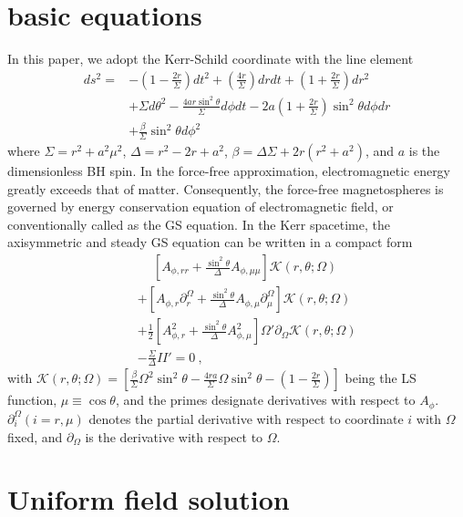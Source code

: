 \documentclass[aps,prd,reprint,nofootinbib, superscriptaddress]{revtex4-1}
\def\nn{\nonumber}
\def\ct{\cos\theta}
\def\sst{\sin^2\theta}
\def\Ar{A_{\phi,r}}
\def\Arr{A_{\phi,rr}}
\def\Am{A_{\phi,\mu}}
\def\Amm{A_{\phi,\mu\mu}}
\def\ben{\begin{eqnarray}}
\def\een{\end{eqnarray}}
\begin{document}
\section{basic equations}
\label{sec:basic}
In this paper, we adopt the Kerr-Schild
coordinate with the line element
\[
\begin{aligned}
ds^2 =
&-\left( 1-\frac{2r}{\Sigma} \right)dt^2 + \left( \frac{4
r}{\Sigma} \right) dr dt + \left(1+\frac{2r}{\Sigma} \right) dr^2 \\
&+ \Sigma d\theta^2 - \frac{4 a r \sin^2\theta}{\Sigma} d\phi dt
- 2 a \left(1+\frac{2r}{\Sigma}\right) \sin^2\theta d\phi dr     \\
& + \frac{\beta}{\Sigma} \sst d\phi^2
\end{aligned}
\]
where $\Sigma = r^2 + a^2 \mu^2$, $\Delta = r^2 -2r + a^2$,
$\beta = \Delta\Sigma + 2r(r^2 + a^2)$, and $a$ is the dimensionless BH spin.
In the force-free approximation, electromagnetic energy greatly exceeds that of matter.
Consequently, the force-free magnetospheres is governed by energy
conservation equation of electromagnetic field, or
conventionally called as the GS equation.
In the Kerr spacetime,
the axisymmetric and steady GS equation can be written in a compact form \cite{Pan2017}
\ben
\label{eq:GSg}
&&\phantom{+}
 \left[\Arr + \frac{\sst}{\Delta}\Amm \right]  \mathcal K(r,\theta; \Omega )\nn \\
&&
+\left[\Ar \partial_r^\Omega  +  \frac{\sst}{\Delta}\Am \partial_\mu^\Omega\right] \mathcal K(r,\theta; \Omega ) \nn \\
&&
+ \frac{1}{2}\left[\Ar^2 + \frac{\sst}{\Delta}\Am^2\right]  \Omega' \partial_\Omega \mathcal K(r,\theta; \Omega )\nn \\
&&
- \frac{\Sigma}{\Delta}II' = 0 \ ,
\een
with $\mathcal K(r,\theta; \Omega )= \left[\frac{\beta}{\Sigma}\Omega^2 \sst
-\frac{4ra}{\Sigma}\Omega \sst
-\left(1-\frac{2r}{\Sigma}\right)\right]$ being the LS function,
$\mu\equiv\ct$,  and  the primes designate  derivatives with respect to $A_\phi$.
$\partial_i^\Omega (i=r, \mu)$  denotes the partial derivative
with respect to coordinate $i$ with $\Omega$ fixed, and $\partial_\Omega$ is the derivative with
respect to $\Omega$.

\section{Uniform field solution}
\label{sec:uni_sol}
\end{document}
